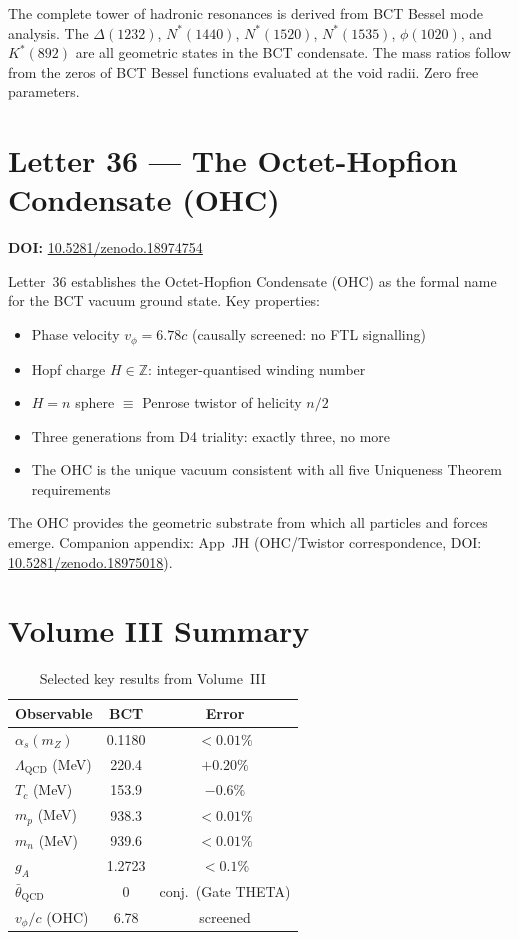 \documentclass[aps,prl,twocolumn,showpacs,preprintnumbers]{revtex4-2}
\newcommand{\LQCD}{\Lambda_{\mathrm{QCD}}}
\begin{document}
\medskip
The complete tower of hadronic resonances is derived from BCT Bessel
mode analysis. The $\Delta(1232)$, $N^*(1440)$, $N^*(1520)$, $N^*(1535)$,
$\phi(1020)$, and $K^*(892)$ are all geometric states in the BCT
condensate. The mass ratios follow from the zeros of BCT Bessel
functions evaluated at the void radii. Zero free parameters.

\section{Letter 36 --- The Octet-Hopfion Condensate (OHC)}
\noindent\textbf{DOI:} \href{https://doi.org/10.5281/zenodo.18974754}{10.5281/zenodo.18974754}

\medskip
Letter~36 establishes the Octet-Hopfion Condensate (OHC) as the
formal name for the BCT vacuum ground state. Key properties:
\begin{itemize}
  \item Phase velocity $v_\phi = 6.78c$ (causally screened: no FTL signalling)
  \item Hopf charge $H \in \mathbb{Z}$: integer-quantised winding number
  \item $H = n$ sphere $\equiv$ Penrose twistor of helicity $n/2$
  \item Three generations from D4 triality: exactly three, no more
  \item The OHC is the unique vacuum consistent with all five Uniqueness Theorem requirements
\end{itemize}
The OHC provides the geometric substrate from which all particles
and forces emerge. Companion appendix: App~JH (OHC/Twistor
correspondence, DOI: \href{https://doi.org/10.5281/zenodo.18975018}{10.5281/zenodo.18975018}).

\section*{Volume III Summary}

\begin{table}[h]
\centering
\caption{Selected key results from Volume~III}
\begin{tabular}{lcc}
\toprule
Observable & BCT & Error \\
\midrule
$\alpha_s(m_Z)$ & 0.1180 & $<0.01\%$ \\
$\LQCD$ (MeV) & 220.4 & $+0.20\%$ \\
$T_c$ (MeV) & 153.9 & $-0.6\%$ \\
$m_p$ (MeV) & 938.3 & $<0.01\%$ \\
$m_n$ (MeV) & 939.6 & $<0.01\%$ \\
$g_A$ & 1.2723 & $<0.1\%$ \\
$\bar\theta_{\mathrm{QCD}}$ & 0 & conj.\ (Gate THETA) \\
$v_\phi/c$ (OHC) & 6.78 & screened \\
\bottomrule
\end{tabular}
\end{table}
\end{document}
